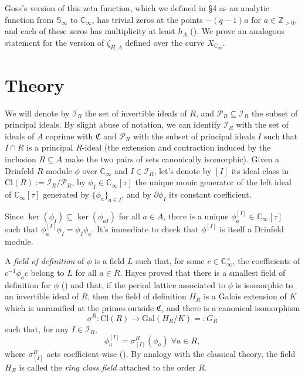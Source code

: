 \documentclass[11pt]{amsart}
\numberwithin{equation}{section}
\newcommand{\CC}{\mathbb{C}}
\begin{document}
Goss's version of this zeta function, which we defined in \S 4 as an analytic function from $\mathbb{S}_\infty$ to ${\CC_\infty}$, has trivial zeros at the points $-(q-1)a$ for $a\in\mathbb{Z}_{>0}$, and each of these zeros has multiplicity at least $h_A$ (\cite[Ex. 8.13.7]{GOS}). We prove an analogous statement for the version of $\zeta_{H,A}$ defined over the curve $X_{\CC_\infty}$.

\section{Theory}

We will denote by $\mathcal{I}_R$ the set of invertible ideals of $R$, and $\mathcal{P}_R\subseteq\mathcal{I}_R$ the subset of principal ideals. By slight abuse of notation, we can identify $\mathcal{I}_R$ with the set of ideals of $A$ coprime with $\mathfrak{C}$ and $\mathcal{P}_R$ with the subset of principal ideals $I$ such that $I\cap R$ is a principal $R$-ideal (the extension and contraction induced by the inclusion $R\subseteq A$ make the two pairs of sets canonically isomorphic). 
Given a Drinfeld $R$-module $\phi$ over ${\CC_\infty}$ and $I\in \mathcal{I}_R$, let's denote by $[I]$ its ideal class in $\mathrm{Cl}(R):=\mathcal{I}_R/\mathcal{P}_R$, by $\phi_I\in {\CC_\infty}[\tau]$ the unique monic generator of the left ideal of ${\CC_\infty}[\tau]$ generated by $\{\phi_a\}_{a\in I}$, and by $\partial\phi_I$ its constant coefficient.

Since $\ker(\phi_I)\subseteq\ker(\phi_{aI})$ for all $a\in A$, there is a unique $\phi_a^{[I]}\in {\CC_\infty}[\tau]$ such that $\phi_a^{[I]}\phi_I=\phi_I\phi_a$. It's immediate to check that $\phi^{[I]}$ is itself a Drinfeld module.

A \emph{field of definition} of $\phi$ is a field $L$ such that, for some $c\in\mathbb{C}_\infty^\times$, the coefficients of $c^{-1}\phi_a c$ belong to $L$ for all $a\in R$.
Hayes proved that there is a smallest field of definition for $\phi$ (\cite[\S 6]{Hayes}) and that, if the period lattice associated to $\phi$ is isomorphic to an invertible ideal of $R$, then the field of definition $H_R$ is a Galois extension of $K$ which is unramified at the primes outside $\mathfrak{C}$, and there is a canonical isomorphism 
\[\sigma^R:\mathrm{Cl}(R)\to\mathrm{Gal}(H_R/K)=: G_R\] such that, for any $I\in\mathcal{I}_R$,
\[\phi_a^{[I]}={\sigma^R_{[I]}}(\phi_a)\;\forall a\in R,\]
where ${\sigma^R_{[I]}}$ acts coefficient-wise (\cite[Th. 8.5, Thm. 8.8]{Hayes}). By analogy with the classical theory, the field $H_R$ is called the \emph{ring class field} attached to the order $R$.
\end{document}
